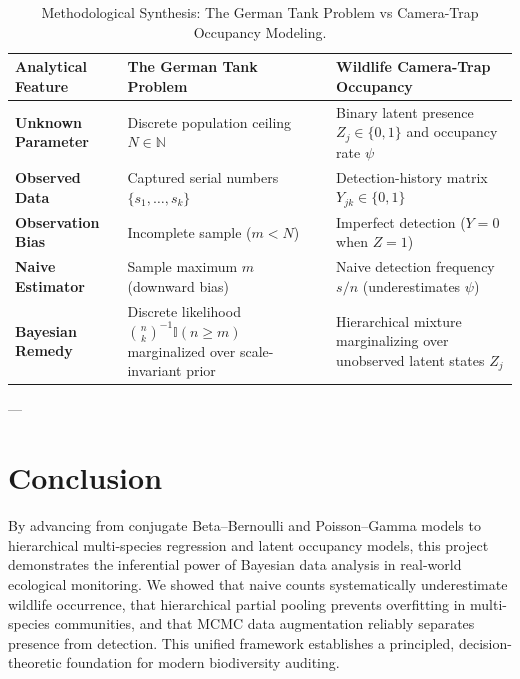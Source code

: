 \documentclass[11pt,a4paper]{article}
\begin{document}
\begin{table}[H]
\centering
\small
\caption{Methodological Synthesis: The German Tank Problem vs Camera-Trap Occupancy Modeling.}
\label{tab:synthesis}
\begin{tabularx}{\textwidth}{lXX}
\toprule
\textbf{Analytical Feature} & \textbf{The German Tank Problem} & \textbf{Wildlife Camera-Trap Occupancy} \\
\midrule
\textbf{Unknown Parameter}  & Discrete population ceiling $N \in \mathbb{N}$ & Binary latent presence $Z_j \in \{0, 1\}$ and occupancy rate $\psi$ \\
\textbf{Observed Data}      & Captured serial numbers $\{s_1, \dots, s_k\}$ & Detection-history matrix $Y_{jk} \in \{0, 1\}$ \\
\textbf{Observation Bias}   & Incomplete sample ($m < N$) & Imperfect detection ($Y = 0$ when $Z = 1$) \\
\textbf{Naive Estimator}    & Sample maximum $m$ (downward bias) & Naive detection frequency $s/n$ (underestimates $\psi$) \\
\textbf{Bayesian Remedy}    & Discrete likelihood $\binom{n}{k}^{-1} \mathbb{I}(n \ge m)$ marginalized over scale-invariant prior & Hierarchical mixture marginalizing over unobserved latent states $Z_j$ \\
\bottomrule
\end{tabularx}
\end{table}

---

\section{Conclusion}
By advancing from conjugate Beta--Bernoulli and Poisson--Gamma models to hierarchical multi-species regression and latent occupancy models, this project demonstrates the inferential power of Bayesian data analysis in real-world ecological monitoring. We showed that naive counts systematically underestimate wildlife occurrence, that hierarchical partial pooling prevents overfitting in multi-species communities, and that MCMC data augmentation reliably separates presence from detection. This unified framework establishes a principled, decision-theoretic foundation for modern biodiversity auditing.
\end{document}
